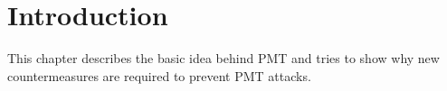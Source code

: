 \section{Introduction}
\label{sec:introduction}
This chapter describes the basic idea behind \gls{PMT} and tries to show why new countermeasures are required to prevent \gls{PMT} attacks.



\medskip




